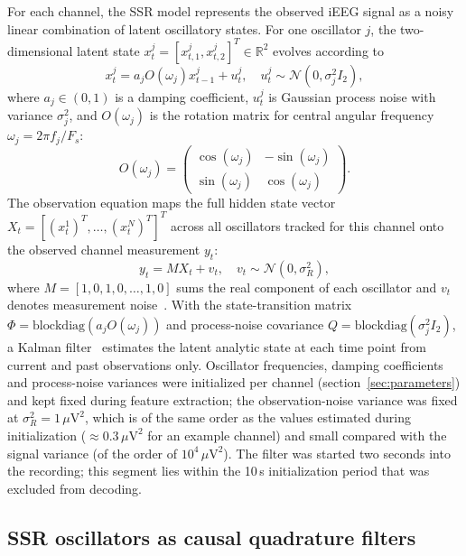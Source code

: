 \documentclass{iopjournal}
\begin{document}
For each channel, the SSR model represents the observed iEEG signal as a noisy linear combination of latent oscillatory states. For one oscillator $j$, the two-dimensional latent state $x_t^j=[x_{t,1}^j,x_{t,2}^j]^T \in \mathbb{R}^2$ evolves according to
\begin{equation}
    x_t^j = a_j O(\omega_j)x_{t-1}^j + u_t^j, \quad u_t^j \sim \mathcal{N}(0,\sigma_j^2 I_2),
\end{equation}
where $a_j \in (0,1)$ is a damping coefficient, $u_t^j$ is Gaussian process noise with variance $\sigma_j^2$, and $O(\omega_j)$ is the rotation matrix for central angular frequency $\omega_j=2\pi f_j/F_s$:
\begin{equation}
    O(\omega_j)=
    \begin{pmatrix}
    \cos(\omega_j) & -\sin(\omega_j) \\
    \sin(\omega_j) & \cos(\omega_j)
    \end{pmatrix}.
\end{equation}
The observation equation maps the full hidden state vector $X_t=[(x_t^1)^T,\ldots,(x_t^N)^T]^T$ across all oscillators tracked for this channel onto the observed channel measurement $y_t$:
\begin{equation}
    y_t = M X_t + v_t, \quad v_t \sim \mathcal{N}(0,\sigma_R^2),
\end{equation}
where $M=[1,0,1,0,\ldots,1,0]$ sums the real component of each oscillator and $v_t$ denotes measurement noise~\cite{Matsuda2017,Wodeyar2021}. With the state-transition matrix $\Phi=\mathrm{blockdiag}(a_jO(\omega_j))$ and process-noise covariance $Q=\mathrm{blockdiag}(\sigma_j^2I_2)$, a Kalman filter~\cite{Kalman1960} estimates the latent analytic state at each time point from current and past observations only. Oscillator frequencies, damping coefficients and process-noise variances were initialized per channel (section~\ref{sec:parameters}) and kept fixed during feature extraction; the observation-noise variance was fixed at $\sigma_R^2=1\,\mu\mathrm{V}^2$, which is of the same order as the values estimated during initialization ($\approx0.3\,\mu\mathrm{V}^2$ for an example channel) and small compared with the signal variance (of the order of $10^4\,\mu\mathrm{V}^2$). The filter was started two seconds into the recording; this segment lies within the 10\,s initialization period that was excluded from decoding.

\subsection{SSR oscillators as causal quadrature filters}
\label{sec:ssr_filters}
\end{document}
